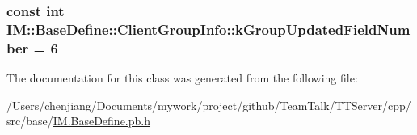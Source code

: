 \subsubsection[{k\+Group\+Updated\+Field\+Number}]{\setlength{\rightskip}{0pt plus 5cm}const int I\+M\+::\+Base\+Define\+::\+Client\+Group\+Info\+::k\+Group\+Updated\+Field\+Number = 6\hspace{0.3cm}{\ttfamily [static]}}\label{class_i_m_1_1_base_define_1_1_client_group_info_a906f2b869704ec81c62b5d58206c412b}


The documentation for this class was generated from the following file\+:\begin{DoxyCompactItemize}
\item 
/\+Users/chenjiang/\+Documents/mywork/project/github/\+Team\+Talk/\+T\+T\+Server/cpp/src/base/\hyperlink{_i_m_8_base_define_8pb_8h}{I\+M.\+Base\+Define.\+pb.\+h}\end{DoxyCompactItemize}
